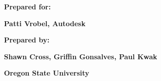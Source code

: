 \documentclass[letterpaper, 10pt, draftclsnofoot, onecolumn]{IEEEtran}
\begin{document}
\bigskip

{\centering{}\bfseries\color{black}
Prepared for:
\par}

{\centering{}\bfseries\color{black}
Patti Vrobel, Autodesk
\par}


\bigskip


\bigskip

{\centering{}\bfseries\color{black}
Prepared by:  
\par}

{\centering{}\bfseries\color{black}
Shawn Cross, Griffin Gonsalves, Paul Kwak
\par}

{\centering{}\bfseries\color{black}
Oregon State University
\par}
\end{document}
